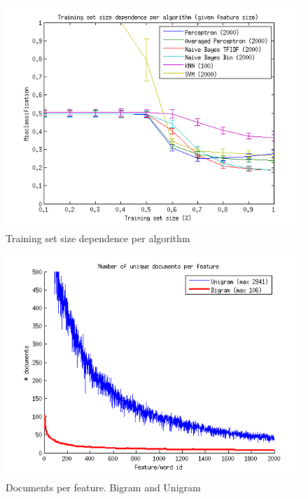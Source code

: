 \begin{figure}[H]
\centering
\includegraphics[scale = 1]{../Plottar/training_size_k_2000allknn_100.png}
\caption{Training set size dependence per algorithm}
\end{figure} 

\begin{figure}[H]
\centering
\includegraphics[scale = 1]{../Plottar/documents_per_feature.png}
\caption{Documents per feature. Bigram and Unigram}
\end{figure} 

